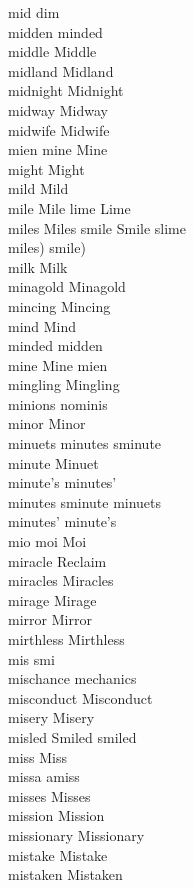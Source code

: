 mid dim\\
midden minded\\
middle Middle\\
midland Midland\\
midnight Midnight\\
midway Midway\\
midwife Midwife\\
mien mine Mine\\
might Might\\
mild Mild\\
mile Mile lime Lime\\
miles Miles smile Smile slime\\
miles) smile)\\
milk Milk\\
minagold Minagold\\
mincing Mincing\\
mind Mind\\
minded midden\\
mine Mine mien\\
mingling Mingling\\
minions nominis\\
minor Minor\\
minuets minutes sminute\\
minute Minuet\\
minute's minutes'\\
minutes sminute minuets\\
minutes' minute's\\
mio moi Moi\\
miracle Reclaim\\
miracles Miracles\\
mirage Mirage\\
mirror Mirror\\
mirthless Mirthless\\
mis smi\\
mischance mechanics\\
misconduct Misconduct\\
misery Misery\\
misled Smiled smiled\\
miss Miss\\
missa amiss\\
misses Misses\\
mission Mission\\
missionary Missionary\\
mistake Mistake\\
mistaken Mistaken\\
